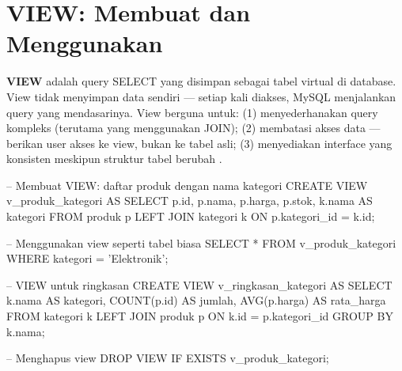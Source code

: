 \section{VIEW: Membuat dan Menggunakan}

\textbf{VIEW} adalah query SELECT yang disimpan sebagai tabel virtual di database. View tidak menyimpan data sendiri --- setiap kali diakses, MySQL menjalankan query yang mendasarinya. View berguna untuk: (1) menyederhanakan query kompleks (terutama yang menggunakan JOIN); (2) membatasi akses data --- berikan user akses ke view, bukan ke tabel asli; (3) menyediakan interface yang konsisten meskipun struktur tabel berubah \cite{mysqlDocs}.

\begin{webcode}[language=SQL, caption={Membuat dan menggunakan VIEW}]
-- Membuat VIEW: daftar produk dengan nama kategori
CREATE VIEW v_produk_kategori AS
SELECT p.id, p.nama, p.harga, p.stok, k.nama AS kategori
FROM produk p
LEFT JOIN kategori k ON p.kategori_id = k.id;

-- Menggunakan view seperti tabel biasa
SELECT * FROM v_produk_kategori WHERE kategori = 'Elektronik';

-- VIEW untuk ringkasan
CREATE VIEW v_ringkasan_kategori AS
SELECT k.nama AS kategori, COUNT(p.id) AS jumlah, AVG(p.harga) AS rata_harga
FROM kategori k LEFT JOIN produk p ON k.id = p.kategori_id
GROUP BY k.nama;

-- Menghapus view
DROP VIEW IF EXISTS v_produk_kategori;
\end{webcode}


